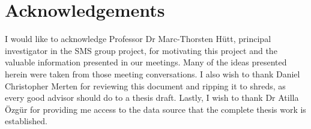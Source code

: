 \chapter*{Acknowledgements}

I would like to acknowledge Professor Dr Marc-Thorsten Hütt, principal investigator in the SMS group project, for motivating this project and the valuable information presented in our meetings. Many of the ideas presented herein were taken from those meeting conversations. I also wish to thank Daniel Christopher Merten for reviewing this document and ripping it to shreds, as every good advisor should do to a thesis draft. Lastly, I wish to thank Dr Atilla Özgür for providing me access to the data source that the complete thesis work is established.
\clearpage